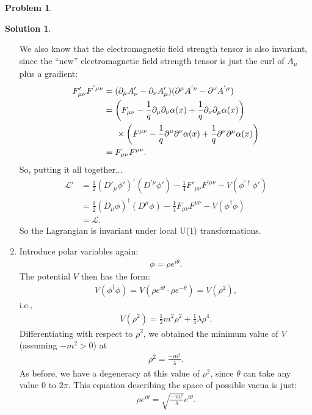 \documentclass{book}
\numberwithin{equation}{section}
\theoremstyle{definition}
\newtheorem{prob}{Problem}[section]
\newtheorem{sln}{Solution}[section]
\newcommand{\p}{\partial}
\newcommand{\lag}{\mathcal{L}}
\begin{document}
\begin{prob}
\begin{sln}
\begin{enumerate}
				We also know that the electromagnetic field strength tensor is also invariant, since the ``new'' electromagnetic field strength tensor is just the curl of $A_\mu$ plus a gradient:
				\begin{align}
				F'_{\mu\nu}F^{'\mu\nu} &= (\p_\mu A'_\nu - \p_\nu A'_\mu)(\p^\mu A^{'\nu} - \p^\nu A^{'\mu} )\nonumber\\
				&= \left(F_{\mu\nu} - \frac{1}{q}\p_\mu\p_\nu \alpha(x) + \frac{1}{q}\p_\nu\p_\mu \alpha(x)\right)\nonumber\\
				&\hspace{0.5cm}\times\left( F^{\mu\nu} - \frac{1}{q}\p^\mu\p^\nu \alpha(x) + \frac{1}{q}\p^\nu\p^\mu \alpha(x) \right)\nonumber\\
				&=F_{\mu\nu}F^{\mu\nu}.
				\end{align}
				So, putting it all together...
				\begin{align}
				\lag' &= \frac{1}{2}(D'_\mu\phi')^\dagger(D^{'\mu}\phi') - \frac{1}{4}F'_{\mu\nu}F^{'\mu\nu} - V(\phi^{'\dagger}\phi')\nonumber\\
				&= \frac{1}{2}(D_\mu\phi)^\dagger(D^\mu\phi) - \frac{1}{4}F_{\mu\nu}F^{\mu\nu} - V(\phi^\dagger\phi)\nonumber\\
				&= \lag.
				\end{align}
				So the Lagrangian is invariant under local U(1) transformations.\\
				
				
				
				
				
				\item Introduce polar variables again:
				\begin{align}
				\phi = \rho e^{i\theta}.
				\end{align}
				The potential $V$ then has the form:
				\begin{align}
				V(\phi^\dagger\phi) = V(\rho e^{i\theta} \cdot \rho e^{-\theta}) = V(\rho^2),
				\end{align}
				i.e.,
				\begin{align}
				V(\rho^2) = \frac{1}{2}m^2\rho^2 + \frac{1}{4}\lambda \rho^4.
				\end{align}
				Differentiating with respect to $\rho^2$, we obtained the minimum value of $V$ (assuming $- m^2 > 0$) at
				\begin{align}
				\rho^2 = \frac{-m^2}{\lambda}.
				\end{align}
				As before, we have a degeneracy at this value of $\rho^2$, since $\theta$ can take any value $0$ to $2\pi$. This equation describing the space of possible vacua is just:
				\begin{align}
				\rho e^{i\theta} = \sqrt{\frac{-m^2}{\lambda}}e^{i\theta}.
				\end{align}
				

\end{enumerate}
\end{sln}
\end{prob}
\end{document}
